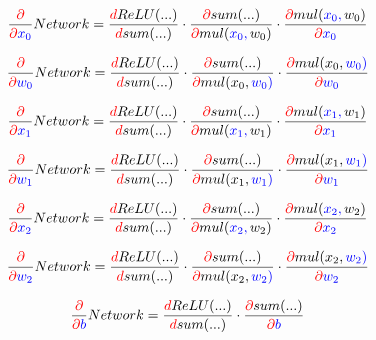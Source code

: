 \documentclass[a4paper,12pt]{article}
\begin{document}
\[ \frac{\color{red}{\partial}}{\color{red}{\partial} \color{blue}{x_0}} Network = \frac{\color{red}{d} \color{black}{ReLU(...)}}{\color{red}{d} \color{black}{sum(...)}} \cdot \frac{\color{red}{\partial} \color{black}{sum(...)}}{\color{red}{\partial} \color{black}{mul(\color{blue}{x_0}, \color{black}{w_0})}} \cdot 
\frac{\color{red}{\partial} \color{black}{mul(\color{blue}{x_0}, \color{black}{w_0})}}{\color{red}{\partial} \color{blue}{x_0}} \] 


\[ \frac{\color{red}{\partial}}{\color{red}{\partial} \color{blue}{w_0}} Network = \frac{\color{red}{d} \color{black}{ReLU(...)}}{\color{red}{d} \color{black}{sum(...)}} \cdot \frac{\color{red}{\partial} \color{black}{sum(...)}}{\color{red}{\partial} \color{black}{mul(\color{black}{x_0}, \color{blue}{w_0})}} \cdot 
\frac{\color{red}{\partial} \color{black}{mul(\color{black}{x_0}, \color{blue}{w_0})}}{\color{red}{\partial} \color{blue}{w_0}} \] 


\[ \frac{\color{red}{\partial}}{\color{red}{\partial} \color{blue}{x_1}} Network = \frac{\color{red}{d} \color{black}{ReLU(...)}}{\color{red}{d} \color{black}{sum(...)}} \cdot \frac{\color{red}{\partial} \color{black}{sum(...)}}{\color{red}{\partial} \color{black}{mul(\color{blue}{x_1}, \color{black}{w_1})}} \cdot 
\frac{\color{red}{\partial} \color{black}{mul(\color{blue}{x_1}, \color{black}{w_1})}}{\color{red}{\partial} \color{blue}{x_1}} \] 

\[ \frac{\color{red}{\partial}}{\color{red}{\partial} \color{blue}{w_1}} Network = \frac{\color{red}{d} \color{black}{ReLU(...)}}{\color{red}{d} \color{black}{sum(...)}} \cdot \frac{\color{red}{\partial} \color{black}{sum(...)}}{\color{red}{\partial} \color{black}{mul(\color{black}{x_1}, \color{blue}{w_1})}} \cdot 
\frac{\color{red}{\partial} \color{black}{mul(\color{black}{x_1}, \color{blue}{w_1})}}{\color{red}{\partial} \color{blue}{w_1}} \] 


\[ \frac{\color{red}{\partial}}{\color{red}{\partial} \color{blue}{x_2}} Network = \frac{\color{red}{d} \color{black}{ReLU(...)}}{\color{red}{d} \color{black}{sum(...)}} \cdot \frac{\color{red}{\partial} \color{black}{sum(...)}}{\color{red}{\partial} \color{black}{mul(\color{blue}{x_2}, \color{black}{w_2})}} \cdot 
\frac{\color{red}{\partial} \color{black}{mul(\color{blue}{x_2}, \color{black}{w_2})}}{\color{red}{\partial} \color{blue}{x_2}} \] 

\[ \frac{\color{red}{\partial}}{\color{red}{\partial} \color{blue}{w_2}} Network = \frac{\color{red}{d} \color{black}{ReLU(...)}}{\color{red}{d} \color{black}{sum(...)}} \cdot \frac{\color{red}{\partial} \color{black}{sum(...)}}{\color{red}{\partial} \color{black}{mul(\color{black}{x_2}, \color{blue}{w_2})}} \cdot 
\frac{\color{red}{\partial} \color{black}{mul(\color{black}{x_2}, \color{blue}{w_2})}}{\color{red}{\partial} \color{blue}{w_2}} \] 

\[ \frac{\color{red}{\partial}}{\color{red}{\partial} \color{blue}{b}} Network = \frac{\color{red}{d} \color{black}{ReLU(...)}}{\color{red}{d} \color{black}{sum(...)}} \cdot \frac{\color{red}{\partial} \color{black}{sum(...)}}{\color{red}{\partial} \color{blue}{b}} \] 
\end{document}
